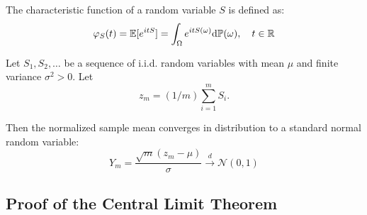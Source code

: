 \begin{definition}
The characteristic function of a random variable $S$ is defined as:
\begin{equation}
\varphi_S(t) = \operatorname{\mathbb{E}}[e^{itS}] = \int_\Omega e^{itS(\omega)} \mathrm{d} \mathbb{P}(\omega), \quad t \in \mathbb{R}
\end{equation}

\end{definition}

\begin{theorem}
Let $S_1, S_2, \dots$ be a sequence of i.i.d. random variables with mean $\mu$ and finite variance $\sigma^2 > 0$. Let
\[
z_m = (1/m) \sum_{i=1}^m S_i.
\]

Then the normalized sample mean converges in distribution to a standard normal random variable:
\begin{equation}
Y_m = \frac{\sqrt{m}(z_m - \mu)}{\sigma} \xrightarrow{d} \mathcal{N}(0, 1)
\end{equation}

\end{theorem}

\subsection{Proof of the Central Limit Theorem}

